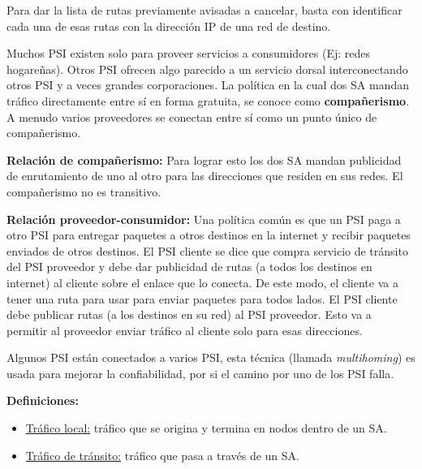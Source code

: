 \documentclass[10pt,a4paper]{report}
\begin{document}
	\par Para dar la lista de rutas previamente avisadas a cancelar, basta con identificar cada una de esas rutas con la dirección IP de una red de destino.
	
	\par Muchos PSI existen solo para proveer servicios a consumidores (Ej: redes 
	hogareñas). Otros PSI ofrecen algo parecido a un servicio dorsal interconectando 
	otros PSI y a veces grandes corporaciones. La política en la cual dos SA mandan tráfico directamente entre sí en forma gratuita, se conoce como \textbf{compañerismo}. A menudo varios proveedores se conectan entre sí como un punto único de compañerismo.
	
	\par \textbf{Relación de compañerismo:} Para lograr esto los dos SA mandan publicidad de enrutamiento de uno al otro para las direcciones que residen en sus redes. El compañerismo no es transitivo.
	
	\par \textbf{Relación proveedor-consumidor:} Una política común es que un PSI paga a otro PSI para entregar paquetes a otros destinos en la internet y recibir paquetes enviados de otros destinos. El PSI cliente se dice que compra servicio de tránsito del PSI proveedor y debe dar publicidad de rutas (a todos los destinos en internet) al cliente sobre el enlace que lo conecta. De este modo, el cliente va a tener una ruta para usar para enviar paquetes para todos lados. El PSI cliente debe publicar rutas (a los destinos en su red) al PSI proveedor. Esto va a permitir al proveedor enviar tráfico al cliente solo para esas direcciones.

	\par Algunos PSI están conectados a varios PSI, esta técnica (llamada \textit{multihoming}) es usada para mejorar la confiabilidad, por si el camino por uno de los PSI falla.

	\par \textbf{Definiciones:}
	\begin{itemize}
		\item \underline{Tráfico local:} tráfico que se origina y termina en nodos dentro de un SA. 		
		\item \underline{Tráfico de tránsito:} tráfico que pasa a través de un SA.
	\end{itemize}
\end{document}
